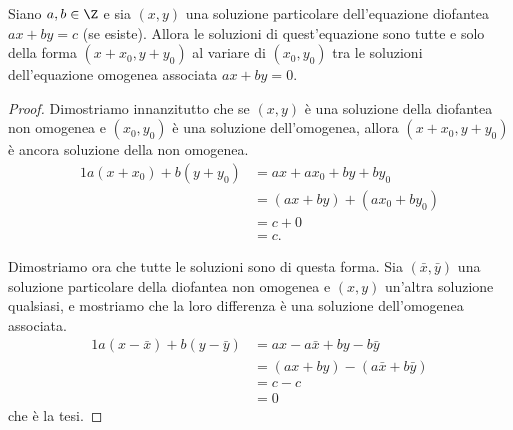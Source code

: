 \begin{theorem}  \label{sol_diofantea_non_omog}
    Siano $a, b \in \Z$ e sia $(x, y)$ una soluzione particolare dell'equazione diofantea $ax + by = c$ (se esiste). Allora le soluzioni di quest'equazione sono tutte e solo della forma $(x + x_0, y + y_0)$ al variare di $(x_0, y_0)$ tra le soluzioni dell'equazione omogenea associata $ax + by = 0$.
\end{theorem}
\begin{proof}
    Dimostriamo innanzitutto che se $(x, y)$ è una soluzione della diofantea non omogenea e $(x_0, y_0)$ è una soluzione dell'omogenea, allora $(x+x_0, y+y_0)$ è ancora soluzione della non omogenea.
    \begin{alignat*}{1}
        a(x + x_0) + b(y + y_0) &= ax + ax_0 + by + by_0 \\
                                &= (ax + by) + (ax_0 + by_0) \\
                                &= c + 0\\
                                &= c.
    \end{alignat*}

    Dimostriamo ora che tutte le soluzioni sono di questa forma. Sia $(\bar{x}, \bar{y})$ una soluzione particolare della diofantea non omogenea e $(x, y)$ un'altra soluzione qualsiasi, e mostriamo che la loro differenza è una soluzione dell'omogenea associata.
    \begin{alignat*}
        {1}
        a(x - \bar{x}) + b(y - \bar{y}) &= ax - a\bar{x} + by - b\bar{y} \\
                                        &= (ax + by) - (a\bar{x} + b\bar{y}) \\
                                        &= c - c\\
                                        &= 0
    \end{alignat*}
    che è la tesi.
\end{proof}


